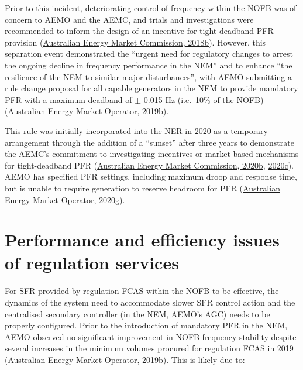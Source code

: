 \documentclass[12pt,a4paper,]{report}
\begin{document}
Prior to this incident, deteriorating control of frequency within the
NOFB was of concern to AEMO and the AEMC, and trials and investigations
were recommended to inform the design of an incentive for tight-deadband
PFR provision
(\protect\hyperlink{ref-australianenergymarketcommissionFrequencyControlFrameworks2018}{Australian
Energy Market Commission, 2018b}). However, this separation event
demonstrated the ``urgent need for regulatory changes to arrest the
ongoing decline in frequency performance in the NEM'' and to enhance
``the resilience of the NEM to similar major disturbances'', with AEMO
submitting a rule change proposal for all capable generators in the NEM
to provide mandatory PFR with a maximum deadband of \(\pm\) 0.015 Hz
(i.e.~10\% of the NOFB)
(\protect\hyperlink{ref-australianenergymarketoperatorElectricityRuleChange2019}{Australian
Energy Market Operator, 2019b}).

This rule was initially incorporated into the NER in 2020 as a temporary
arrangement through the addition of a ``sunset'' after three years to
demonstrate the AEMC's commitment to investigating incentives or
market-based mechanisms for tight-deadband PFR
(\protect\hyperlink{ref-australianenergymarketcommissionMandatoryPrimaryFrequency2020}{Australian
Energy Market Commission, 2020b},
\protect\hyperlink{ref-australianenergymarketcommissionFrequencyControlRule2020}{2020c}).
AEMO has specified PFR settings, including maximum droop and response
time, but is unable to require generation to reserve headroom for PFR
(\protect\hyperlink{ref-australianenergymarketoperatorInterimPrimaryFrequency2020}{Australian
Energy Market Operator, 2020g}).

\hypertarget{sec:fcs-regulation}{%
\section{Performance and efficiency issues of regulation
services}\label{sec:fcs-regulation}}

For SFR provided by regulation FCAS within the NOFB to be effective, the
dynamics of the system need to accommodate slower SFR control action and
the centralised secondary controller (in the NEM, AEMO's AGC) needs to
be properly configured. Prior to the introduction of mandatory PFR in
the NEM, AEMO observed no significant improvement in NOFB frequency
stability despite several increases in the minimum volumes procured for
regulation FCAS in 2019
(\protect\hyperlink{ref-australianenergymarketoperatorElectricityRuleChange2019}{Australian
Energy Market Operator, 2019b}). This is likely due to:
\end{document}
